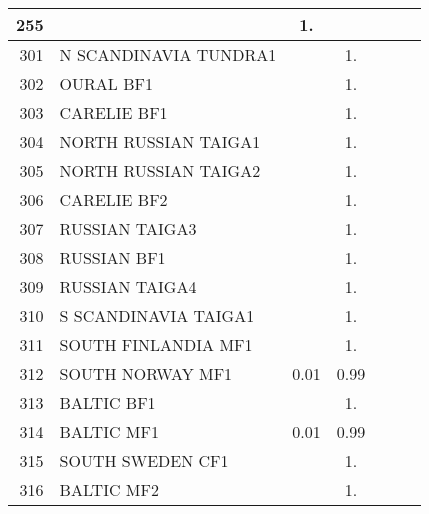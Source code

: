 {{\begin{tabular}{||r|l||c|c|c|c|c||}
 \hline
         255  &                                                              &  1.   &       &       &       \\
 \hline
         301  & N SCANDINAVIA TUNDRA1                                        &       &  1.   &       &       \\
 \hline
         302  & OURAL BF1                                                    &       &  1.   &       &       \\
 \hline
         303  & CARELIE BF1                                                  &       &  1.   &       &       \\
 \hline
         304  & NORTH RUSSIAN TAIGA1                                         &       &  1.   &       &       \\
 \hline
         305  & NORTH RUSSIAN TAIGA2                                         &       &  1.   &       &       \\
 \hline
         306  & CARELIE BF2                                                  &       &  1.   &       &       \\
 \hline
         307  & RUSSIAN TAIGA3                                               &       &  1.   &       &       \\
 \hline
         308  & RUSSIAN BF1                                                  &       &  1.   &       &       \\
 \hline
         309  & RUSSIAN TAIGA4                                               &       &  1.   &       &       \\
 \hline
         310  & S SCANDINAVIA TAIGA1                                         &       &  1.   &       &       \\
 \hline
         311  & SOUTH FINLANDIA MF1                                          &       &  1.   &       &       \\
 \hline
         312  & SOUTH NORWAY MF1                                             &  0.01 &  0.99 &       &       \\
 \hline
         313  & BALTIC BF1                                                   &       &  1.   &       &       \\
 \hline
         314  & BALTIC MF1                                                   &  0.01 &  0.99 &       &       \\
 \hline
         315  & SOUTH SWEDEN CF1                                             &       &  1.   &       &       \\
 \hline
         316  & BALTIC MF2                                                   &       &  1.   &       &       \\

\end{tabular}}}
